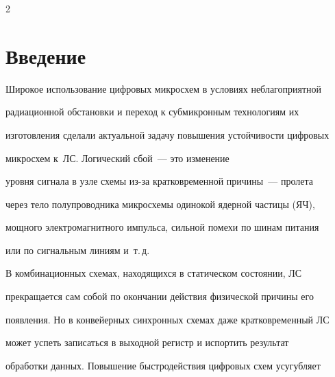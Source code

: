 



  









\thispagestyle{headings}



\begin{multicols}{2}



\label{st\stat}



\section{Введение}



  Широкое использование цифровых микросхем в условиях неблагоприятной 

радиационной обстановки и переход к субмикронным технологиям их 

изготовления сделали актуальной задачу повышения устойчивости цифровых 

микросхем к~ЛС. Логический сбой~--- это изменение 

уровня сигнала в узле схемы из-за кратковременной причины~--- пролета 

через тело полупроводника мик\-ро\-схе\-мы одинокой ядерной частицы (ЯЧ), 

мощного электромагнитного импульса, сильной помехи по шинам питания 

или по сигнальным линиям и~т.\,д.

  

  В комбинационных схемах, находящихся в статическом состоянии, ЛС 

прекращается сам собой по окончании действия физической причины его 

появления. Но в конвейерных синхронных схемах даже кратковременный ЛС 

может успеть записаться в выходной регистр и испортить результат 

обработки данных. Повышение быстродействия цифровых схем усугубляет 


\end{multicols}
